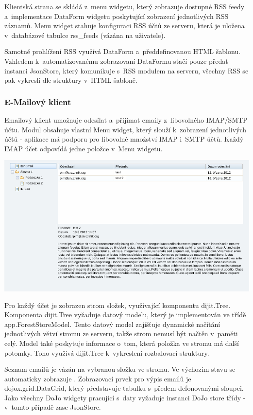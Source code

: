 \documentclass[bc,male,html,dept460]{diploma}				%
\begin{document}
Klientská strana se skládá z~menu widgetu, který zobrazuje dostupné RSS feedy a~implementace DataForm widgetu poskytující zobrazení jednotlivých RSS záznamů. Menu widget stahuje konfiguraci RSS účtů ze serveru, která je uložena v~databázové tabulce rss\_feeds (vázána na uživatele).

Samotné prohlížení RSS využívá DataForm a~předdefinovanou HTML šablonu. Vzhledem k~automatizovanému zobrazovaní DataFormu stačí pouze předat instanci JsonStore, který komunikuje s~RSS modulem na serveru, všechny RSS se pak vykreslí dle struktury v~HTML šabloně.

\subsubsection{E-Mailový klient}
Emailový klient umožnuje odesílat a~přijímat emaily z~libovolného IMAP/SMTP účtu.
Modul obsahuje vlastní Menu widget, který slouží k~zobrazení jednotlivých účtů - aplikace má podporu pro libovolné množství IMAP i~SMTP účtů. Každý IMAP účet odpovídá jedne položce v~Menu widgetu.

\includegraphics[width=\textwidth]{../mailScreen.png} 

Pro každý účet je zobrazen strom složek, využívající komponentu dijit.Tree. Komponenta dijit.Tree vyžaduje datový modelu, který je implementován ve třídě app.ForestStoreModel. Tento datový model zajišťuje dynamické načítání jednotlivých větví stromu ze serveru, takže strom nemusí být načtěn v~paměti celý.
Model také poskytuje informace o~tom, která položka ve stromu má další potomky. Toho využívá dijit.Tree k~vykreslení rozbalovací struktury.

Seznam emailů je vázán na vybranou složku ve stromu. Ve výchozím stavu se automaticky zobrazuje . Zobrazovací prvek pro výpis emailů je dojox.grid.DataGrid, který představuje tabulku s~předem defonovanými sloupci. Jako všechny DoJo widgety pracující s~daty vyžaduje instanci DoJo store třídy - v~tomto případě zase JsonStore.
\end{document}
